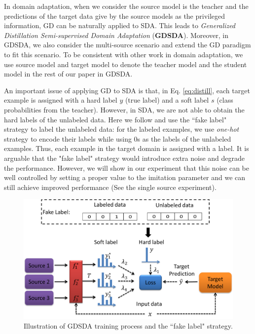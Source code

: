 In domain adaptation, when we consider the source model is the teacher and the predictions of the target data give by the source models as the privileged information,
GD can be naturally applied to SDA. This leads to \textit{Generalized Distillation Semi-supervised Domain Adaptation} (\textbf{GDSDA}). Moreover, in GDSDA, we also consider the multi-source scenario and extend the GD paradigm to fit this scenario. To be consistent with other work in domain adaptation, we use source model and target model to denote the teacher model and the student model in the rest of our paper in GDSDA.

An important issue of applying GD to SDA is that, in Eq. \eqref{eq:distill}, each target example is assigned with a hard label $y$ (true label) and a soft label $s$ (class probabilities from the teacher). However, in SDA, we are not able to obtain the hard labels of the unlabeled data. Here we follow \cite{lopez2015unifying} and use the ``fake label" strategy to label the unlabeled data: for the labeled examples, we use \textit{one-hot} strategy to encode their labels while using 0s as the labels of the unlabeled examples. Thus, each example in the target domain is assigned with a label. It is arguable that the "fake label" strategy would introduce extra noise and degrade the performance. However, we will show in our experiment that this noise can be well controlled by setting a proper value to the imitation parameter and we can still achieve improved performance (See the single source experiment).
\begin{figure}
	\centering
	\includegraphics[scale=.4]{figure/multi-GDDA.png}
	\caption{Illustration of GDSDA training process and the ``fake label" strategy.}
	\label{fig:GDSDA}
\end{figure}
 
